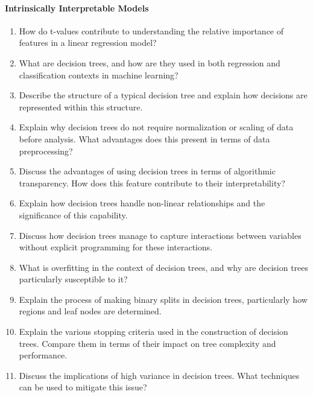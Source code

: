 \paragraph*{Intrinsically Interpretable Models}
\begin{enumerate}
    \item How do t-values contribute to understanding the relative importance of features in a linear regression model?
    \item What are decision trees, and how are they used in both regression and classification contexts in machine learning?
    \item Describe the structure of a typical decision tree and explain how decisions are represented within this structure.
    \item Explain why decision trees do not require normalization or scaling of data before analysis. What advantages does this present in terms of data preprocessing?
    \item Discuss the advantages of using decision trees in terms of algorithmic transparency. How does this feature contribute to their interpretability?
    \item Explain how decision trees handle non-linear relationships and the significance of this capability.
    \item Discuss how decision trees manage to capture interactions between variables without explicit programming for these interactions.
    \item What is overfitting in the context of decision trees, and why are decision trees particularly susceptible to it?
    \item Explain the process of making binary splits in decision trees, particularly how regions and leaf nodes are determined.
    \item Explain the various stopping criteria used in the construction of decision trees. Compare them in terms of their impact on tree complexity and performance.
    \item Discuss the implications of high variance in decision trees. What techniques can be used to mitigate this issue?
\end{enumerate}
